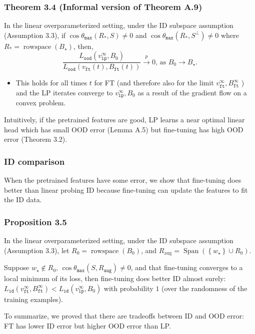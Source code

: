 \documentclass[16pt,aspectratio=169]{beamer}
\begin{document}
\begin{frame}
    \frametitle{Theorem 3.4 (Informal version of Theorem A.9)}

    In the linear overparameterized setting, under the ID subspace assumption (Assumption 3.3), if $\cos \theta_{\mathtt{max}}\left(R_*, S\right) \neq 0$ and $\cos \theta_{\mathtt{max}}\left(R_*, S^{\perp}\right) \neq 0$ where $R_*=\operatorname{rowspace}\left(B_{\star}\right)$, then,
    \begin{equation}
        \frac{L_{\mathtt{ood}}\left(v_{\mathtt{lp}}^{\infty}, B_0\right)}{L_{\mathtt{ood}}\left(v_{\mathtt{ft}}(t), B_{\mathtt{ft}}(t)\right)} \stackrel{p}{\rightarrow} 0 \text {, as } B_0 \rightarrow B_{\star} .
    \end{equation}

    \begin{itemize}
        \item This holds for all times $t$ for FT (and therefore also for the limit $v_{\mathtt{ft}}^{\infty}, B_{\mathtt{ft}}^{\infty}$ ) and the LP iterates converge to $v_{\mathtt{lp}}^{\infty}, B_0$ as a result of the gradient flow on a convex problem.
    \end{itemize}
    
    Intuitively, if the pretrained features are good, LP learns a near optimal linear head which has small OOD error (Lemma A.5) but fine-tuning has high OOD error (Theorem 3.2).

\end{frame}

\begin{frame}
    \frametitle{ID comparison}

    When the pretrained features have some error, we show that fine-tuning does better than linear probing ID because fine-tuning can update the features to fit the ID data.

\end{frame}

\begin{frame}
    \frametitle{Proposition 3.5}

    In the linear overparameterized setting, under the ID subspace assumption (Assumption 3.3), let $R_0=\operatorname{rowspace}\left(B_0\right)$, and $R_{\text {aug}}=\operatorname{Span}\left(\left\{w_{\star}\right\} \cup R_0\right)$. 

    Suppose $w_{\star} \notin R_0$, $\cos \theta_{\mathtt{max}}\left(S, R_{\mathtt{aug}}\right) \neq 0$, and that fine-tuning converges to a local minimum of its loss, then fine-tuning does better ID almost surely: $L_{\mathtt{id}}\left(v_{\mathtt{ft}}^{\infty}, B_{\mathtt{ft}}^{\infty}\right)<L_{\mathtt{id}}\left(v_{\mathtt{lp}}^{\infty}, B_0\right)$ with probability $1$ (over the randomness of the training examples).
    
    To summarize, we proved that there are tradeoffs between ID and OOD error: \\
    {\color{blue}FT has lower ID error but higher OOD error than LP.} 

\end{frame}
\end{document}
